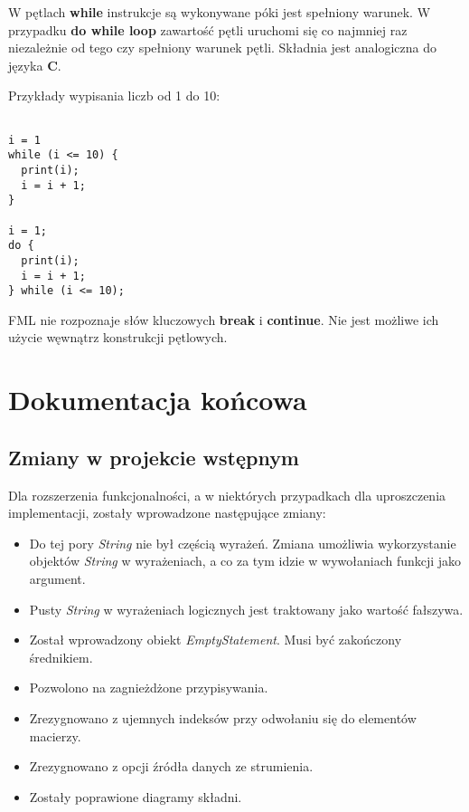 \documentclass[12pt,a4paper]{article}
\begin{document}
W pętlach \textbf{while} instrukcje są wykonywane póki jest spełniony warunek. W przypadku \textbf{do while loop} zawartość pętli uruchomi się co najmniej raz niezależnie od tego czy spełniony warunek pętli. Składnia jest analogiczna do języka \textbf{C}.

\medskip
Przykłady wypisania liczb od 1 do 10:

\begin{lstlisting}

i = 1
while (i <= 10) {
  print(i);
  i = i + 1;
}

i = 1;
do {
  print(i);
  i = i + 1;
} while (i <= 10);

\end{lstlisting}

FML nie rozpoznaje słów kluczowych \textbf{break} i \textbf{continue}. Nie jest możliwe ich użycie węwnątrz konstrukcji pętlowych.

\pagebreak

\section{Dokumentacja końcowa}

\subsection{Zmiany w projekcie wstępnym}

Dla rozszerzenia funkcjonalności, a w niektórych przypadkach dla uproszczenia implementacji, zostały wprowadzone następujące zmiany:

\begin{itemize}

\item Do tej pory \emph{String} nie był częścią wyrażeń. Zmiana umożliwia wykorzystanie objektów \emph{String} w wyrażeniach, a co za tym idzie w wywołaniach funkcji jako argument.

\item Pusty \emph{String} w wyrażeniach logicznych jest traktowany jako wartość fałszywa.

\item Został wprowadzony obiekt \emph{EmptyStatement}. Musi być zakończony średnikiem.

\item Pozwolono na zagnieżdżone przypisywania.

\item Zrezygnowano z ujemnych indeksów przy odwołaniu się do elementów macierzy.

\item Zrezygnowano z opcji źródła danych ze strumienia.

\item Zostały poprawione diagramy składni.

\end{itemize}
\end{document}
